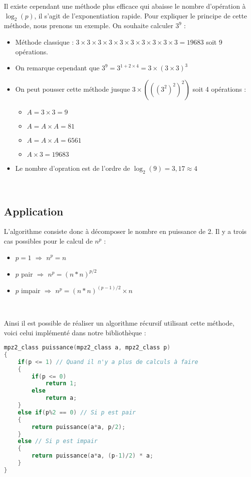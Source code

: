 Il existe cependant une méthode plus efficace qui abaisse le nombre d'opération à $\log_2(p)$, il s'agit de l'exponentiation rapide. Pour expliquer le principe de cette méthode, nous prenons un exemple. On souhaite calculer $3^9$ :
\begin{itemize}
	\item Méthode classique : $3\times 3\times 3\times 3\times 3\times 3\times 3\times 3\times 3\times 3=19683$ soit 9 opérations.
	\item On remarque cependant que $3^9=3^{1+2\times4}=3\times(3\times3)^3$
	\item On peut pousser cette méthode jusque $3\times\left(\left(\left(3^2\right)^2\right)^2\right)$ soit 4 opérations :
	\begin{itemize}
		\item $A=3\times3 = 9$
		\item $A=A\times A = 81$
		\item $A=A\times A = 6561$
		\item $A\times3 = 19683$
	\end{itemize}
	\item Le nombre d'opration est de l'ordre de $\log_2(9)=3,17\approx 4$
\end{itemize} \ \\


\subsection{Application}
L'algorithme consiste donc à décomposer le nombre en puissance de 2. Il y a trois cas possibles pour le calcul de $n^p$ :

\begin{itemize}
	\item $p=1$ $\Rightarrow$ $n^p=n$
	\item $p$ pair $\Rightarrow$ $n^p=(n*n)^{p/2}$
	\item $p$ impair $\Rightarrow$ $n^p=(n*n)^{(p-1)/2} \times n$
\end{itemize} \ 

Ainsi il est possible de réaliser un algorithme récursif utilisant cette méthode, voici celui implémenté dans notre bibliothèque :

\begin{lstlisting}[language=C++]
mpz2_class puissance(mpz2_class a, mpz2_class p)
{
    if(p <= 1) // Quand il n'y a plus de calculs à faire
    {
        if(p <= 0)
            return 1;
        else
            return a;
    }
    else if(p%2 == 0) // Si p est pair
    {
        return puissance(a*a, p/2);
    }
    else // Si p est impair
    {
        return puissance(a*a, (p-1)/2) * a;
    }
}
\end{lstlisting}

